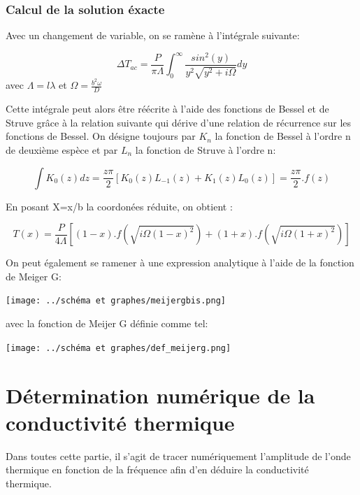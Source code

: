 \documentclass[10pt,a4paper]{report}
\begin{document}
\subsection{Calcul de la solution éxacte }
 Avec un changement de variable, on se ramène à l’intégrale suivante:
\begin{center}
\begin{equation}
\Delta T_{ac}=\frac{P}{\pi\Lambda}\int_{0}^\infty \frac{sin^2(y)}{y^2\sqrt{y^2+i\Omega}}dy
\end{equation}
avec $\Lambda=l\lambda$ et $\Omega=\frac{b^2\omega}{D}$
\end{center}
Cette intégrale peut alors être réécrite à l’aide des fonctions de Bessel et de Struve grâce à la relation suivante qui dérive d’une relation de récurrence sur les fonctions de Bessel. On désigne toujours par $K_{n}$ la fonction de Bessel à l’ordre n de deuxième espèce et par $L_{n}$ la fonction de Struve à l’ordre n:
\begin{center}
\begin{equation}
\int K_{0}(z)dz=\frac{z\pi}{2}[K_{0}(z)L_{-1}(z)+K_{1}(z)L_{0}(z)]=\frac{z\pi}{2}.f(z)
\end{equation}
\end{center}
En posant X=x/b la coordonées réduite, on obtient :
\begin{center}
\begin{equation}
T(x)=\frac{P}{4\Lambda}[(1-x).f(\sqrt{i\Omega(1-x)^2})+(1+x).f(\sqrt{i\Omega(1+x)^2})]
\end{equation}
\end{center}
\begin{center}
\end{center}
On peut également se ramener à une expression analytique à l’aide de la fonction de Meiger G:
\begin{center}
\texttt{[image: ../schéma et graphes/meijergbis.png]}
\end{center}
avec la fonction de Meijer G définie comme tel:
\begin{center}
\texttt{[image: ../schéma et graphes/def\_meijerg.png]}
\end{center}
\chapter{Détermination numérique de la conductivité thermique }
Dans toutes cette partie, il s'agit de tracer numériquement l'amplitude de l'onde thermique en fonction de la fréquence afin d'en déduire la conductivité thermique.
\end{document}
